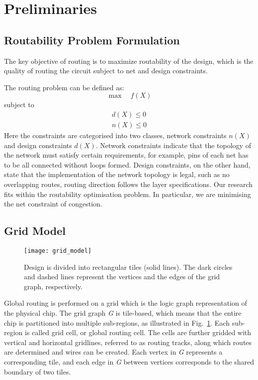 \section{Preliminaries}
\label{sec:prelim}

\subsection{Routability Problem Formulation}
The key objective of routing is to maximize routability of the design, which is the quality of routing the circuit subject to net and design constraints.

The routing problem can be defined as:
\begin{equation}
\max \quad f(X) 
\end{equation}
subject to
\begin{equation}
\begin{split}
d(X) \leq 0 \\
n(X) \leq 0
\end{split}
\end{equation}
Here the constraints are categorised into two classes, network constraints $n(X)$ and design constraints $d(X)$. Network constraints indicate that the topology of the network must satisfy certain requirements, for example, pins of each net has to be all connected without loops formed. Design constraints, on the other hand, state that the implementation of the network topology is legal, such as no overlapping routes, routing direction follows the layer specifications. Our research fits within the routability optimisation problem. In particular, we are minimising the net constraint of congestion.

\subsection{Grid Model}
\label{subsec:grid model}
\begin{figure}[htbp]
	\centerline{\texttt{[image: grid\_model]}}
	\caption{Design is divided into rectangular tiles (solid lines). The dark
		circles and dashed lines represent the vertices and the edges of the grid graph, respectively.}
	\label{fig:grid_model}
\end{figure}

Global routing is performed on a grid which is the logic graph representation of the physical chip. The grid graph \emph{G} is tile-based, which means that the entire chip is partitioned into multiple sub-regions, as illustrated in Fig.~\ref{fig:grid_model}. Each sub-region is called grid cell, or global routing cell. The cells are further gridded with vertical and horizontal gridlines, referred to as routing tracks, along which routes are determined and wires can be created. Each vertex in \emph{G} represents a corresponding tile, and each edge in \emph{G} between vertices corresponds to the shared boundary of two tiles.

